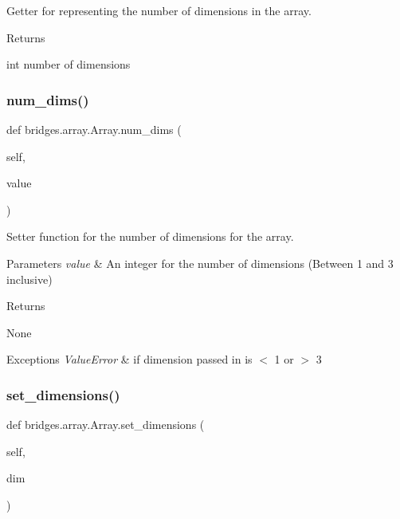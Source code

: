 Getter for representing the number of dimensions in the array. 

\begin{DoxyReturn}{Returns}


int number of dimensions 
\end{DoxyReturn}
\mbox{\label{classbridges_1_1array_1_1_array_ab7374f0d4bb0a9514b4af29bdd8935a5}} 
\subsubsection{\texorpdfstring{num\+\_\+dims()}{num\_dims()}\hspace{0.1cm}{\footnotesize\ttfamily [2/2]}}
{\footnotesize\ttfamily def bridges.\+array.\+Array.\+num\+\_\+dims (\begin{DoxyParamCaption}\item[{}]{self,  }\item[{}]{value }\end{DoxyParamCaption})}



Setter function for the number of dimensions for the array. 


\begin{DoxyParams}{Parameters}
{\em value} & An integer for the number of dimensions (Between 1 and 3 inclusive) \\
\hline
\end{DoxyParams}
\begin{DoxyReturn}{Returns}


None
\end{DoxyReturn}

\begin{DoxyExceptions}{Exceptions}
{\em Value\+Error} & if dimension passed in is $<$ 1 or $>$ 3 \\
\hline
\end{DoxyExceptions}
\mbox{\label{classbridges_1_1array_1_1_array_a9824fe5690df106136c3b4eada33e420}} 
\subsubsection{\texorpdfstring{set\+\_\+dimensions()}{set\_dimensions()}}
{\footnotesize\ttfamily def bridges.\+array.\+Array.\+set\+\_\+dimensions (\begin{DoxyParamCaption}\item[{}]{self,  }\item[{}]{dim }\end{DoxyParamCaption})}




